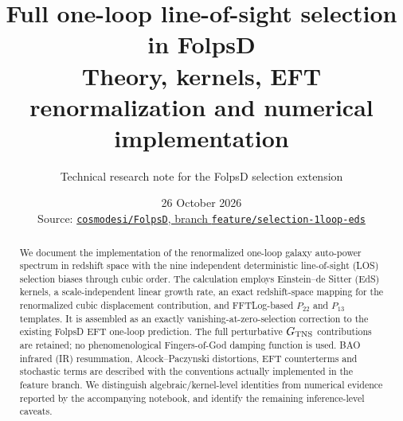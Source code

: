 \documentclass[11pt,a4paper]{article}
\title{\bfseries Full one-loop line-of-sight selection in FolpsD\\[4pt]
\large Theory, kernels, EFT renormalization and numerical implementation}
\author{Technical research note for the FolpsD selection extension}
\date{26 October 2026\\[3pt]\small Source: \href{https://github.com/cosmodesi/FolpsD/tree/feature/selection-1loop-eds}{\texttt{cosmodesi/FolpsD}, branch \texttt{feature/selection-1loop-eds}}}
\begin{document}
\maketitle
\begin{abstract}
We document the implementation of the renormalized one-loop galaxy auto-power spectrum in redshift space with the nine independent deterministic line-of-sight (LOS) selection biases through cubic order. The calculation employs Einstein--de Sitter (EdS) kernels, a scale-independent linear growth rate, an exact redshift-space mapping for the renormalized cubic displacement contribution, and FFTLog-based $P_{22}$ and $P_{13}$ templates. It is assembled as an exactly vanishing-at-zero-selection correction to the existing FolpsD EFT one-loop prediction. The full perturbative $G_{\rm TNS}$ contributions are retained; no phenomenological Fingers-of-God damping function is used. BAO infrared (IR) resummation, Alcock--Paczynski distortions, EFT counterterms and stochastic terms are described with the conventions actually implemented in the feature branch. We distinguish algebraic/kernel-level identities from numerical evidence reported by the accompanying notebook, and identify the remaining inference-level caveats.
\end{abstract}
\tableofcontents
\clearpage
\end{document}
